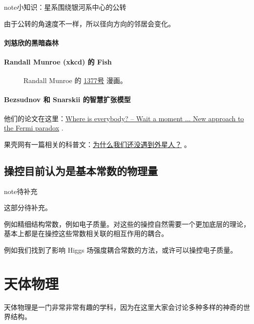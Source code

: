 \documentclass[letterpaper,10pt,english]{sphinxmanual}
\begin{document}
\begin{notice}{note}{小知识：星系围绕银河系中心的公转}

由于公转的角速度不一样，所以径向方向的邻居会变化。
\end{notice}


\paragraph{刘慈欣的黑暗森林}
\label{physics:index-9}\label{physics:id33}

\paragraph{Randall Munroe (xkcd) 的 Fish}
\label{physics:randall-munroe-xkcd-fish}\begin{figure}[htbp]
\centering
\capstart
\caption{Randall Munroe 的 \href{http://xkcd.com/1377/}{1377号} 漫画。}\end{figure}


\paragraph{Bezsudnov 和 Snarskii 的智慧扩张模型}
\label{physics:bezsudnov-snarskii}\label{physics:index-11}
他们的论文在这里：\href{http://arxiv.org/abs/1007.2774}{Where is everybody? -- Wait a moment ... New approach to the Fermi paradox} .

果壳网有一篇相关的科普文：\href{http://www.guokr.com/article/129942/}{为什么我们还没遇到外星人？} 。


\subsection{操控目前认为是基本常数的物理量}
\label{physics:id36}
\begin{notice}{note}{待补充}

这部分待补充。
\end{notice}

例如精细结构常数，例如电子质量。对这些的操控自然需要一个更加底层的理论，基本上都是在操控这些常数相关联的相互作用的耦合。

例如我们找到了影响 Higgs 场强度耦合常数的方法，或许可以操控电子质量。


\section{天体物理}
\label{astro::doc}\label{astro:id1}
天体物理是一门非常非常有趣的学科，因为在这里大家会讨论多种多样的神奇的世界结构。
\end{document}
